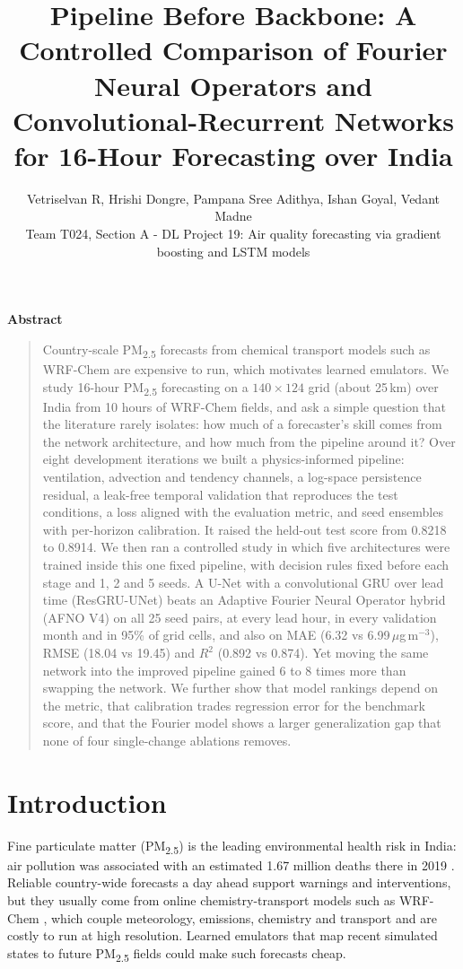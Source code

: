 \documentclass[10pt]{article}
\title{Pipeline Before Backbone: A Controlled Comparison of Fourier Neural Operators and Convolutional-Recurrent Networks for 16-Hour \PM{} Forecasting over India}
\author{%
  \begin{tabular}{c}
  Vetriselvan R, Hrishi Dongre, Pampana Sree Adithya, Ishan Goyal, Vedant Madne \\[2pt]
  \small Team T024, Section A - DL Project 19: Air quality forecasting via gradient boosting and LSTM models
  \end{tabular}}
\newcommand{\PM}{PM\textsubscript{2.5}}
\begin{document}
\maketitle

\begin{center}\textbf{\large Abstract}\end{center}
\vspace{-4pt}
\begin{quote}
Country-scale \PM{} forecasts from chemical transport models such as WRF-Chem are expensive to run, which motivates learned emulators. We study 16-hour \PM{} forecasting on a $140\times124$ grid (about 25\,km) over India from 10 hours of WRF-Chem fields, and ask a simple question that the literature rarely isolates: how much of a forecaster's skill comes from the network architecture, and how much from the pipeline around it? Over eight development iterations we built a physics-informed pipeline: ventilation, advection and tendency channels, a log-space persistence residual, a leak-free temporal validation that reproduces the test conditions, a loss aligned with the evaluation metric, and seed ensembles with per-horizon calibration. It raised the held-out test score from 0.8218 to 0.8914. We then ran a controlled study in which five architectures were trained inside this one fixed pipeline, with decision rules fixed before each stage and 1, 2 and 5 seeds. A U-Net with a convolutional GRU over lead time (ResGRU-UNet) beats an Adaptive Fourier Neural Operator hybrid (AFNO V4) on all 25 seed pairs, at every lead hour, in every validation month and in 95\% of grid cells, and also on MAE (6.32 vs 6.99\,$\mu$g\,m$^{-3}$), RMSE (18.04 vs 19.45) and $R^2$ (0.892 vs 0.874). Yet moving the same network into the improved pipeline gained 6 to 8 times more than swapping the network. We further show that model rankings depend on the metric, that calibration trades regression error for the benchmark score, and that the Fourier model shows a larger generalization gap that none of four single-change ablations removes.
\end{quote}

\section{Introduction}

Fine particulate matter (\PM) is the leading environmental health risk in India: air pollution was associated with an estimated 1.67 million deaths there in 2019 \citep{pandey2021}. Reliable country-wide forecasts a day ahead support warnings and interventions, but they usually come from online chemistry-transport models such as WRF-Chem \citep{grell2005}, which couple meteorology, emissions, chemistry and transport and are costly to run at high resolution. Learned emulators that map recent simulated states to future \PM{} fields could make such forecasts cheap.
\end{document}
